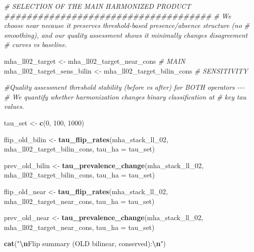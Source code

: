 \documentclass[
  11pt,
]{article}
\newenvironment{Shaded}{\begin{snugshade}}{\end{snugshade}}
\newcommand{\AttributeTok}[1]{\textcolor[rgb]{0.13,0.29,0.53}{#1}}
\newcommand{\CommentTok}[1]{\textcolor[rgb]{0.56,0.35,0.01}{\textit{#1}}}
\newcommand{\DecValTok}[1]{\textcolor[rgb]{0.00,0.00,0.81}{#1}}
\newcommand{\FunctionTok}[1]{\textcolor[rgb]{0.13,0.29,0.53}{\textbf{#1}}}
\newcommand{\NormalTok}[1]{#1}
\newcommand{\OtherTok}[1]{\textcolor[rgb]{0.56,0.35,0.01}{#1}}
\newcommand{\SpecialCharTok}[1]{\textcolor[rgb]{0.81,0.36,0.00}{\textbf{#1}}}
\newcommand{\StringTok}[1]{\textcolor[rgb]{0.31,0.60,0.02}{#1}}
\begin{document}
\begin{Shaded}
\begin{Highlighting}[]
\CommentTok{\# SELECTION OF THE MAIN HARMONIZED PRODUCT \#\#\#\#\#\#\#\#\#\#\#\#\#\#\#\#\#\#\#\#\#\#\#\#\#\#\#\#\#\#\#\#\#\#\#\#\#}
\CommentTok{\# We choose near necause it preserves threshold{-}based presence/absence structure (no}
\CommentTok{\# smoothing), and our quality assessment shows it minimally changes disagreement }
\CommentTok{\# curves vs baseline.}

\NormalTok{mha\_ll02\_target }\OtherTok{\textless{}{-}}\NormalTok{ mha\_ll02\_target\_near\_cons }\CommentTok{\# MAIN}
\NormalTok{mha\_ll02\_target\_sens\_bilin }\OtherTok{\textless{}{-}}\NormalTok{ mha\_ll02\_target\_bilin\_cons }\CommentTok{\# SENSITIVITY}

\CommentTok{\#Quality assessment threshold stability (before vs after) for BOTH operators {-}{-}{-}}
\CommentTok{\# We quantify whether harmonization changes binary classification at }
\CommentTok{\# key tau values.}

\NormalTok{tau\_set }\OtherTok{\textless{}{-}} \FunctionTok{c}\NormalTok{(}\DecValTok{0}\NormalTok{, }\DecValTok{100}\NormalTok{, }\DecValTok{1000}\NormalTok{)}

\NormalTok{flip\_old\_bilin }\OtherTok{\textless{}{-}} \FunctionTok{tau\_flip\_rates}\NormalTok{(mha\_stack\_ll\_02, }
\NormalTok{                                 mha\_ll02\_target\_bilin\_cons, }
                                 \AttributeTok{tau\_ha =}\NormalTok{ tau\_set)}

\NormalTok{prev\_old\_bilin }\OtherTok{\textless{}{-}} \FunctionTok{tau\_prevalence\_change}\NormalTok{(mha\_stack\_ll\_02, }
\NormalTok{                                        mha\_ll02\_target\_bilin\_cons, }
                                        \AttributeTok{tau\_ha =}\NormalTok{ tau\_set)}

\NormalTok{flip\_old\_near  }\OtherTok{\textless{}{-}} \FunctionTok{tau\_flip\_rates}\NormalTok{(mha\_stack\_ll\_02, }
\NormalTok{                                 mha\_ll02\_target\_near\_cons,  }
                                 \AttributeTok{tau\_ha =}\NormalTok{ tau\_set)}

\NormalTok{prev\_old\_near  }\OtherTok{\textless{}{-}} \FunctionTok{tau\_prevalence\_change}\NormalTok{(mha\_stack\_ll\_02, }
\NormalTok{                                        mha\_ll02\_target\_near\_cons,  }
                                        \AttributeTok{tau\_ha =}\NormalTok{ tau\_set)}

\FunctionTok{cat}\NormalTok{(}\StringTok{"}\SpecialCharTok{\textbackslash{}n}\StringTok{Flip summary (OLD bilinear, conserved):}\SpecialCharTok{\textbackslash{}n}\StringTok{"}\NormalTok{)}
\end{Highlighting}
\end{Shaded}
\end{document}
